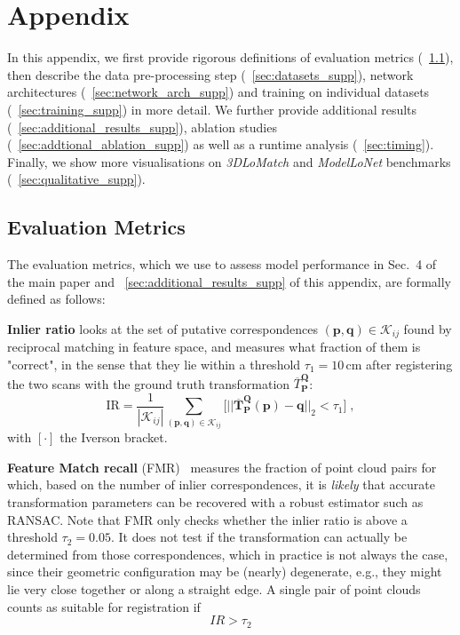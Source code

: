 \section{Appendix}
In this appendix, we first provide rigorous definitions of evaluation metrics (~\cref{sec:evaluation_metrics_supp}), then describe the data pre-processing step (~\cref{sec:datasets_supp}), network architectures (~\cref{sec:network_arch_supp}) and training on individual datasets (~\cref{sec:training_supp}) in more detail. We further provide additional results (~\cref{sec:additional_results_supp}), ablation studies (~\cref{sec:addtional_ablation_supp}) as well as a runtime analysis (~\cref{sec:timing}). Finally, we show more visualisations on \emph{3DLoMatch} and \emph{ModelLoNet} benchmarks (~\cref{sec:qualitative_supp}). 


\subsection{Evaluation Metrics}
\label{sec:evaluation_metrics_supp}
The evaluation metrics, which we use to assess model performance in Sec.~4 of the main paper and ~\cref{sec:additional_results_supp} of this appendix, are formally defined as follows:

\textbf{Inlier ratio} looks at the set of putative correspondences $(\mathbf{p}, \mathbf{q}) \in \mathcal{K}_{i j}$ found by reciprocal matching%
in feature space, and measures what fraction of them is "correct", in the sense that they lie within a threshold $\tau_1\!=\!10\,$cm after registering the two scans with the ground truth transformation $\overbar{T}_\mathbf{P}^ \mathbf{Q}$:
\begin{equation}
\mathrm{IR} = \frac{1}{\left|\mathcal{K}_{ij}\right|} \sum_{\left(\mathbf{p}, \mathbf{q}\right) \in \mathcal{K}_{ij}} \big[ ||\overbar{\mathbf{T}}_\mathbf{P}^ \mathbf{Q}(\mathbf{p})-\mathbf{q}||_2<\tau_{1} \big]  \;,
\end{equation}
with $[\cdot]$ the Iverson bracket.

\textbf{Feature Match recall} (FMR)~\cite{deng2018ppfnet} measures the fraction of point cloud pairs for which, based on the number of inlier correspondences, it is \emph{likely} that accurate transformation parameters can be recovered with a robust estimator such as RANSAC.
Note that FMR only checks whether the inlier ratio is above a threshold $\tau_2=0.05$. It does not test if the transformation can actually be determined from those correspondences, which in practice is not always the case, since their geometric configuration may be (nearly) degenerate, e.g., they might lie very close together or along a straight edge.
A single pair of point clouds counts as suitable for registration if%
\begin{equation}
    IR > \tau_2
\end{equation}

